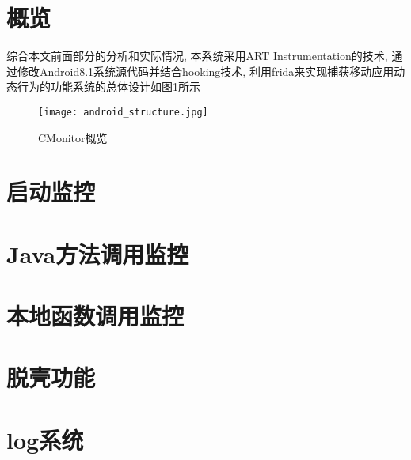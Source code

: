 \section{概览}
综合本文前面部分的分析和实际情况, 本系统采用ART Instrumentation的技术, 通过修改Android8.1系统源代码并结合hooking技术, 利用frida来实现捕获移动应用动态行为的功能\juhao 系统的总体设计如图\ref{cmonitoroverview}所示\juhao
\begin{figure}[ht]
	\centering
	\texttt{[image: android\_structure.jpg]}
	\caption{CMonitor概览}
	\label{cmonitoroverview}
\end{figure}

\section{启动监控}
\section{Java方法调用监控}
\section{本地函数调用监控}
\section{脱壳功能}
\section{log系统}